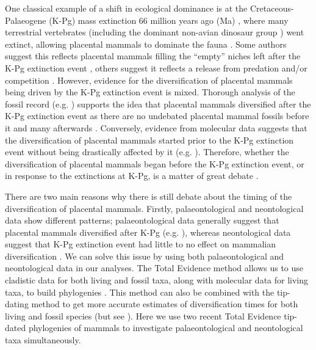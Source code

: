 \documentclass[10pt,letterpaper]{article}
\begin{document}
One classical example of a shift in ecological dominance is at the Cretaceous-Palaeogene (K-Pg) mass extinction 66 million years ago (Ma) \cite{rennetime2013}, where many terrestrial vertebrates (including the dominant non-avian dinosaur group \cite{archibald2011extinction,rennetime2013,Brusatte2015}) went extinct, allowing placental mammals to dominate the fauna \cite{archibald2011extinction,Lovergrove}. 
Some authors suggest this reflects placental mammals filling the ``empty'' niches left after the K-Pg extinction event \cite{archibald2011extinction,OLeary08022013}, others suggest it reflects a release from predation and/or competition \cite{Slater2012MEE,Lovergrove}.
However, evidence for the diversification of placental mammals being driven by the K-Pg extinction event is mixed.
Thorough analysis of the fossil record (e.g. \cite{goswamia2011,OLeary08022013}) supports the idea that placental mammals diversified after the K-Pg extinction event as there are no undebated placental mammal fossils before it and many afterwards \cite{archibald2011extinction,goswamia2011,Slater2012MEE,OLeary08022013,Wilson2013,Brusatte2015}. 
Conversely, evidence from molecular data suggests that the diversification of placental mammals started prior to the K-Pg extinction event without being drastically affected by it (e.g. \cite{Douady2003285,bininda2007delayed,meredithimpacts2011,Stadler12042011}).
Therefore, whether the diversification of placental mammals began before the K-Pg extinction event, or in response to the extinctions at K-Pg, is a matter of great debate \cite{dosReis2012,OLeary08022013,Springer09082013,OLeary09082013,dosReis2014}. 

There are two main reasons why there is still debate about the timing of the diversification of placental mammals. 
Firstly, palaeontological and neontological data show different patterns; palaeontological data generally suggest that placental mammals diversified after K-Pg (e.g. \cite{OLeary08022013}), whereas neontological data suggest that K-Pg extinction event had little to no effect on mammalian diversification \cite{bininda2007delayed,meredithimpacts2011,Stadler12042011}.
We can solve this issue by using both palaeontological and neontological data in our analyses. 
The Total Evidence method allows us to use cladistic data for both living and fossil taxa, along with molecular data for living taxa, to build phylogenies \cite{ronquista2012}. %
This method can also be combined with the tip-dating method \cite{ronquista2012,Wood01032013} to get more accurate estimates of diversification times for both living and fossil species (but see \cite{Arcila2015131}).
Here we use two recent Total Evidence tip-dated phylogenies of mammals \cite{Slater2012MEE,beckancient2014} to investigate palaeontological and neontological taxa simultaneously.
\end{document}
